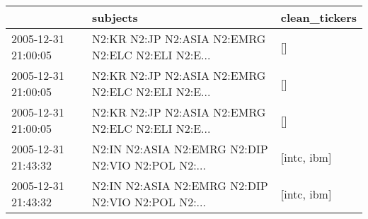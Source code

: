 \begin{tabular}{lll}
\toprule
{} &                                           subjects & clean\_tickers \\
\midrule
2005-12-31 21:00:05 &  N2:KR N2:JP N2:ASIA N2:EMRG N2:ELC N2:ELI N2:E... &            [] \\
2005-12-31 21:00:05 &  N2:KR N2:JP N2:ASIA N2:EMRG N2:ELC N2:ELI N2:E... &            [] \\
2005-12-31 21:00:05 &  N2:KR N2:JP N2:ASIA N2:EMRG N2:ELC N2:ELI N2:E... &            [] \\
2005-12-31 21:43:32 &  N2:IN N2:ASIA N2:EMRG N2:DIP N2:VIO N2:POL N2:... &   [intc, ibm] \\
2005-12-31 21:43:32 &  N2:IN N2:ASIA N2:EMRG N2:DIP N2:VIO N2:POL N2:... &   [intc, ibm] \\
\bottomrule
\end{tabular}
